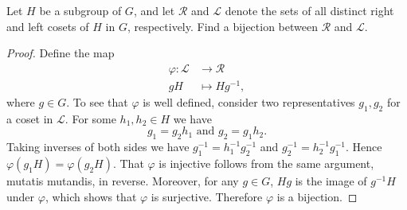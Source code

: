 \documentclass[10pt]{amsart}
\begin{document}
\begin{thm}
  Let $H$ be a subgroup of $G$, and let $\mathcal{R}$ and $\mathcal{L}$ denote the sets of all distinct right and left cosets of $H$ in $G$, respectively. 
  Find a bijection between $\mathcal{R}$ and $\mathcal{L}$.
  \begin{proof}
    Define the map
	\begin{align*}
		\varphi \colon \mathcal{L} &\rightarrow \mathcal{R}\\
		gH &\mapsto Hg^{-1},
	\end{align*}
	where $g \in G$.
	To see that $\varphi$ is well defined, consider two representatives $g_1, g_2$ for a coset in $\mathcal{L}$.
	For some $h_1, h_2 \in H$ we have $$g_1 = g_2h_1 \text{ and } g_2 = g_1h_2.$$
	Taking inverses of both sides we have $g_1^{-1} = h_1^{-1}g_2^{-1}$ and $g_2^{-1} = h_2^{-1}g_1^{-1}$.
	Hence $\varphi(g_1H) = \varphi(g_2H)$.
	That $\varphi$ is injective follows from the same argument, mutatis mutandis, in reverse.
	Moreover, for any $g \in G$, $Hg$ is the image of $g^{-1}H$ under $\varphi$, which shows that $\varphi$ is surjective.
	Therefore $\varphi$ is a bijection.
  \end{proof}
\end{thm}
\end{document}
